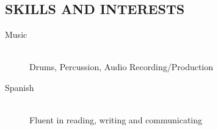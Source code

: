 \documentclass[margin]{res}
\begin{document}
\begin{resume}
    \section{SKILLS AND INTERESTS}
      \begin{description}
        \item[Music] \hfill \\
        Drums, Percussion, Audio Recording/Production
        \item[Spanish] \hfill \\
        Fluent in reading, writing and communicating
      \end{description}
            
  \end{resume}
\end{document}
